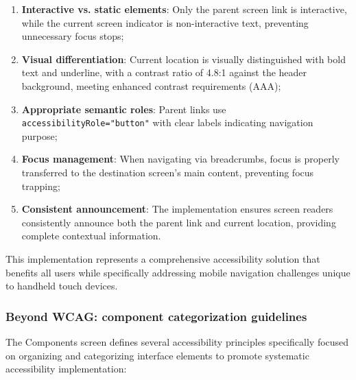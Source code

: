 \begin{enumerate}
    \item \textbf{Interactive vs. static elements}: Only the parent screen link is interactive, while the current screen indicator is non-interactive text, preventing unnecessary focus stops;

    \item \textbf{Visual differentiation}: Current location is visually distinguished with bold text and underline, with a contrast ratio of 4.8:1 against the header background, meeting enhanced contrast requirements (AAA);

    \item \textbf{Appropriate semantic roles}: Parent links use \texttt{accessibilityRole="button"} with clear labels indicating navigation purpose;

    \item \textbf{Focus management}: When navigating via breadcrumbs, focus is properly transferred to the destination screen's main content, preventing focus trapping;
    
    \item \textbf{Consistent announcement}: The implementation ensures screen readers consistently announce both the parent link and current location, providing complete contextual information.
\end{enumerate}

This implementation represents a comprehensive accessibility solution that benefits all users while specifically addressing mobile navigation challenges unique to handheld touch devices.

\FloatBarrier

\subsubsection{Beyond WCAG: component categorization guidelines}

The Components screen defines several accessibility principles specifically focused on organizing and categorizing interface elements to promote systematic accessibility implementation:

